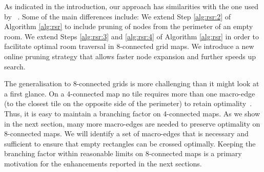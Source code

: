 As indicated in the introduction, our approach has similarities with the one used by 
\citeauthor{harabor10}~.
Some of the main differences include:
We extend Step \ref{alg:rsr:2} of Algorithm \ref{alg:rsr} 
to include pruning of nodes from the perimeter of an empty room.
We extend Steps \ref{alg:rsr:3} and \ref{alg:rsr:4} of Algorithm
\ref{alg:rsr} in order to facilitate optimal room traversal in 8-connected grid
maps. 
{We introduce a new online pruning strategy that allows faster node
expansion and further speeds up search.}

The generalisation to 8-connected grids is more challenging than it might look at a first glance.
On a 4-connected map no tile requires more than one macro-edge
(to the closest tile on the opposite side of the perimeter)
to retain optimality~\cite{harabor10}.
Thus, it is easy to maintain a branching factor on 4-connected maps.
As we show in the next section, many more macro-edges are needed to preserve optimality
on 8-connected maps. We will identify a set of macro-edges that is necessary and sufficient
to ensure that empty rectangles can be crossed optimally.
Keeping the branching factor within reasonable limits on 8-connected maps
is a primary motivation for the enhancements reported in the next sections.

